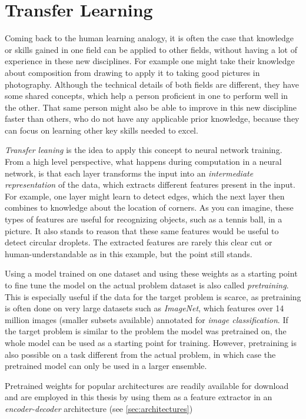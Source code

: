 \section{Transfer Learning}
\label{sec:transfer_learning}

Coming back to the human learning analogy, it is often the case that knowledge or skills gained in one field can be applied to other fields, without having a lot of experience in these new disciplines. For example one might take their knowledge about composition from drawing to apply it to taking good pictures in photography. Although the technical details of both fields are different, they have some shared concepts, which help a person proficient in one to perform well in the other. That same person might also be able to improve in this new discipline faster than others, who do not have any applicable prior knowledge, because they can focus on learning other key skills needed to excel.

\emph{Transfer leaning} is the idea to apply this concept to neural network training. From a high level perspective, what happens during computation in a neural network, is that each layer transforms the input into an \emph{intermediate representation} of the data, which extracts different features present in the input. For example, one layer might learn to detect edges, which the next layer then combines to knowledge about the location of corners. As you can imagine, these types of features are useful for recognizing objects, such as a tennis ball, in a picture. It also stands to reason that these same features would be useful to detect circular droplets. The extracted features are rarely this clear cut or human-understandable as in this example, but the point still stands. 

Using a model trained on one dataset and using these weights as a starting point to fine tune the model on the actual problem dataset is also called \emph{pretraining}. This is especially useful if the data for the target problem is scarce, as pretraining is often done on very large datasets such as \emph{ImageNet}, which features over 14 million images (smaller subsets available) annotated for \emph{image classification}.
If the target problem is similar to the problem the model was pretrained on, the whole model can be used as a starting point for training. 
However, pretraining is also possible on a task different from the actual problem, in which case the pretrained model can only be used in a larger ensemble.

Pretrained weights for popular architectures are readily available for download and are employed in this thesis by using them as a feature extractor in an \emph{encoder-decoder} architecture (see \ref{sec:architectures})

